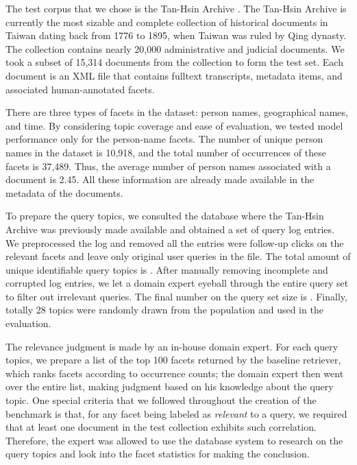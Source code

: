 The test corpus that we chose is the Tan-Hsin Archive .  The
Tan-Hsin Archive is currently the most sizable and complete collection of
historical documents in Taiwan dating back from 1776 to 1895, when Taiwan was
ruled by Qing dynasty.  The collection contains nearly 20,000 administrative
and judicial documents.  We took a subset of 15,314 documents from the
collection to form the test set.  Each document is an XML file that contains
fulltext transcripts, metadata items, and associated human-annotated facets.  

There are three types of facets in the dataset: person names, geographical
names, and time.  By considering topic coverage and ease of evaluation, we
tested model performance only for the person-name facets.  The number of unique
person names in the dataset is 10,918, and the total number of occurrences of
these facets is 37,489.  Thus, the average number of person names associated
with a document is 2.45.  All these information are already made available in
the metadata of the documents.  

To prepare the query topics, we consulted the database where the Tan-Hsin
Archive was previously made available and obtained a set of query log entries.
We preprocessed the log and removed all the entries were follow-up clicks on
the relevant facets and leave only original user queries in the file.  The
total amount of unique identifiable query topics is .  After
manually removing incomplete and corrupted log entries, we let a domain expert
eyeball through the entire query set to filter out irrelevant queries.   The
final number on the query set size is .  Finally, totally 28
topics were randomly drawn from the population and used in the evaluation.

The relevance judgment is made by an in-house domain expert.  For each query
topics, we prepare a list of the top 100 facets returned by the baseline
retriever, which ranks facets according to occurrence counts; the domain expert
then went over the entire list, making judgment based on his knowledge about
the query topic.  One special criteria that we followed throughout the creation
of the benchmark is that, for any facet being labeled as \emph{relevant} to a
query, we required that at least one document in the test collection exhibits
such correlation.  Therefore, the expert was allowed to use the database system
to research on the query topics and look into the facet statistics for making
the conclusion.

